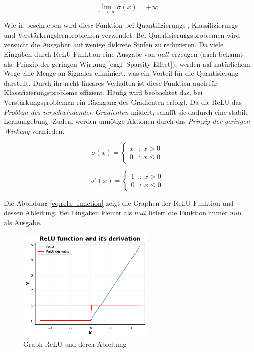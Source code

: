 \begin{equation}\label{eq:non_saturating_relu}
	\lim_{z -> \infty} \sigma(x) = + \infty
\end{equation}

Wie in \cite{yuen_universal_2021} beschrieben wird diese Funktion bei Quantifizierungs-, Klassifizierungs- und Verstärkungslernproblemen verwendet. Bei Quantisierungsproblemen wird versucht die Ausgaben auf wenige diskrete Stufen zu reduzieren. Da viele Eingaben durch ReLU Funktion eine Ausgabe von $null$ erzeugen (auch bekannt als: Prinzip der geringen Wirkung [engl. Sparsity Effect]), werden auf natürlichem Wege eine Menge an Signalen eliminiert, was ein Vorteil für die Quantisierung darstellt. Durch ihr nicht lineares Verhalten ist diese Funktion auch für Klassifizierungsprobleme effizient. Häufig wird beobachtet das, bei Verstärkungsproblemen ein Rückgang des Gradienten erfolgt. Da die ReLU das \textit{Problem des verschwindenden Gradienten} mildert, schafft sie dadurch eine stabile Lernumgebung. Zudem werden unnötige Aktionen durch das \textit{Prinzip der geringen Wirkung} vermieden.

\begin{equation}\label{eq:relu_function}
	\sigma (x) = \left\{
	\begin{array}{cl}
		x & : \ x > 0 \\
		0 & : \ x \leq 0
	\end{array}
	\right.
\end{equation}

\begin{equation}\label{eq:derivative_relu_function}
	\sigma' (x) = \left\{
	\begin{array}{cl}
		1 & : \ x > 0 \\
		0 & : \ x \leq 0
	\end{array}
	\right.
\end{equation}

Die Abbildung \ref{eq:relu_function} zeigt die Graphen der ReLU Funktion und dessen Ableitung. Bei Eingaben kleiner als $null$ liefert die Funktion immer $null$ als Ausgabe.

\begin{figure}[!ht]
	\includegraphics[width=0.6\textwidth]{content/chapter_basics/plots/relu_func_plot.eps}
	\centering
	\caption{Graph ReLU und deren Ableitung}
	\label{img:relu_func_graph}
\end{figure}

